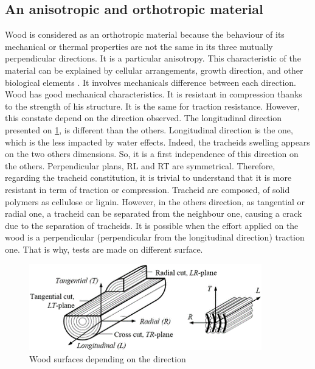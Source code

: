 \subsection{An anisotropic and orthotropic material}

Wood is considered as an orthotropic material because the behaviour of its mechanical or thermal properties are not the same in its three mutually perpendicular directions. It is a particular anisotropy. This characteristic of the material can be explained by cellular arrangements, growth direction, and other biological elements \parencite{Reference1}. It involves mechanicals difference between each direction.
Wood has good mechanical characteristics. It is resistant in compression thanks to the strength of his structure. It is the same for traction resistance. However, this constate depend on the direction observed.  
The longitudinal direction presented on \ref{fig:Fig2}, is different than the others. Longitudinal direction is the one, which is the less impacted by water effects. Indeed, the tracheids swelling appears on the two others dimensions. So, it is a first independence of this direction on the others. Perpendicular plans, RL and RT are symmetrical. 
Therefore, regarding the tracheid constitution, it is trivial to understand that it is more resistant in term of traction or compression. Tracheid are composed, \parencite{Reference4} of solid polymers as cellulose or lignin. However, in the others direction, as tangential or radial one, a tracheid can be separated from the neighbour one, causing a crack due to the separation of tracheids. It is possible when the effort applied on the wood is a perpendicular (perpendicular from the longitudinal direction) traction one. That is why, tests are made on different surface.
\begin{figure}[th]
	\centering
	\includegraphics{Figures/Wood Surfaces}
	\decoRule
	\caption[Wood surfaces]{Wood surfaces depending on the direction}
	\label{fig:Fig2}
\end{figure}



